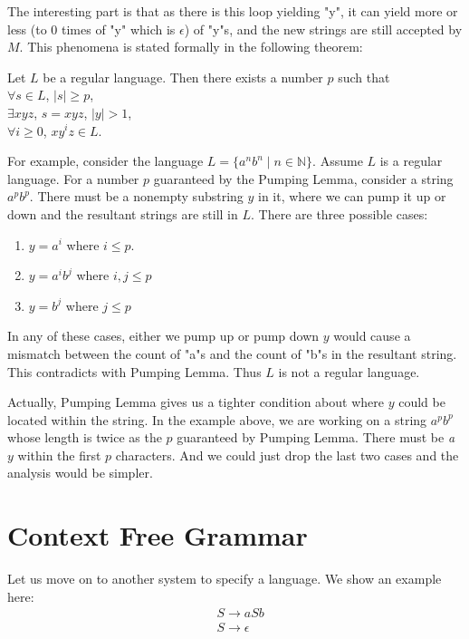 \documentclass[11pt]{article}
\begin{document}
The interesting part is that as there is this loop yielding "y", it can
yield more or less (to $0$ times of "y" which is $\epsilon$) of "y"s, and
the new strings are still accepted by $M$. This phenomena is stated
formally in the following theorem:
\begin{theorem}
Let $L$ be a regular language. Then there exists a number $p$ such that \\
$\forall s \in L$, $|s| \geq p$, \\
\indent $\exists xyz$, $s = xyz$, $|y| > 1$, \\
\indent\indent $\forall i \geq 0$, $xy^iz \in L$.
\end{theorem}

For example, consider the language $L = \{a^nb^n \mid n \in \mathbb{N}\}$.
Assume $L$ is a regular language. For a number $p$ guaranteed by the Pumping
Lemma, consider a string $a^pb^p$. There must be a nonempty substring $y$ in
it, where we can pump it up or down and the resultant strings are still in
$L$. There are three possible cases:
\begin{enumerate}
\item $y = a^i$ where $i \leq p$.
\item $y = a^ib^j$ where $i, j \leq p$
\item $y = b^j$ where $j \leq p$
\end{enumerate}

In any of these cases, either we pump up or pump down $y$ would cause a
mismatch between the count of "a"s and the count of "b"s in the resultant
string. This contradicts with Pumping Lemma. Thus $L$ is not a regular
language.

Actually, Pumping Lemma gives us a tighter condition about where $y$ could
be located within the string. In the example above, we are working on a
string $a^pb^p$ whose length is twice as the $p$ guaranteed by Pumping
Lemma. There must be \emph{a} $y$ within the first $p$ characters. And we
could just drop the last two cases and the analysis would be simpler.

\section{Context Free Grammar}

Let us move on to another system to specify a language. We show an example
here:
\begin{align*}
&S \rightarrow aSb \\
&S \rightarrow \epsilon
\end{align*}
\end{document}
